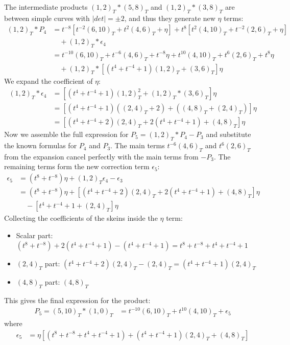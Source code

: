 \documentclass[12pt]{article}
\begin{document}
The intermediate products $(1,2)_T \ast (5,8)_T$ and $(1,2)_T \ast (3,8)_T$ are between simple curves with $|det|=\pm 2$, and thus they generate new $\eta$ terms:
\begin{align*}
(1,2)_T \ast P_4 &= t^{-8}\left[t^{-2}(6,10)_T+t^{2}(4,6)_T+\eta\right] + t^{8}\left[t^{2}(4,10)_T+t^{-2}(2,6)_T+\eta\right] \\
&\quad + (1,2)_T \ast \epsilon_4 \\[0.5em]
&= t^{-10}(6,10)_T+t^{-6}(4,6)_T+t^{-8}\eta + t^{10}(4,10)_T+t^{6}(2,6)_T+t^{8}\eta \\
&\quad + (1,2)_T \ast \left[ (t^4 + t^{-4} + 1)(1,2)_T + (3,6)_T \right]\eta
\end{align*}
We expand the coefficient of $\eta$:
\begin{align*}
(1,2)_T \ast \epsilon_4 &= \left[ (t^4 + t^{-4} + 1)(1,2)_T^2 + (1,2)_T \ast (3,6)_T \right]\eta \\
&= \left[ (t^4 + t^{-4} + 1)((2,4)_T+2) + ((4,8)_T+(2,4)_T) \right]\eta \\
&= \left[ (t^4 + t^{-4} + 2)(2,4)_T + 2(t^4 + t^{-4} + 1) + (4,8)_T \right]\eta
\end{align*}
Now we assemble the full expression for $P_5 = (1,2)_T \ast P_4 - P_3$ and substitute the known formulas for $P_4$ and $P_3$. The main terms $t^{-6}(4,6)_T$ and $t^{6}(2,6)_T$ from the expansion cancel perfectly with the main terms from $-P_3$. The remaining terms form the new correction term $\epsilon_5$:
\begin{align*}
\epsilon_5 &= (t^8+t^{-8})\eta + (1,2)_T\epsilon_4 - \epsilon_3 \\
&= (t^8+t^{-8})\eta + \left[ (t^4 + t^{-4} + 2)(2,4)_T + 2(t^4 + t^{-4} + 1) + (4,8)_T \right]\eta \\
&\quad - \left[ t^4 + t^{-4} + 1 + (2,4)_T \right]\eta
\end{align*}
Collecting the coefficients of the skeins inside the $\eta$ term:
\begin{itemize}
    \item Scalar part: $(t^8+t^{-8}) + 2(t^4+t^{-4}+1) - (t^4+t^{-4}+1) = t^8+t^{-8}+t^4+t^{-4}+1$
    \item $(2,4)_T$ part: $(t^4+t^{-4}+2)(2,4)_T - (2,4)_T = (t^4+t^{-4}+1)(2,4)_T$
    \item $(4,8)_T$ part: $(4,8)_T$
\end{itemize}
This gives the final expression for the product:
\begin{align*}
P_5 = (5,10)_T \ast (1,0)_T &= t^{-10}(6,10)_T + t^{10}(4,10)_T + \epsilon_5
\end{align*}
where
\begin{align*}
\epsilon_5 &= \eta \left[ (t^8+t^{-8}+t^4+t^{-4}+1) + (t^4+t^{-4}+1)(2,4)_T + (4,8)_T \right]
\end{align*}
\end{document}
